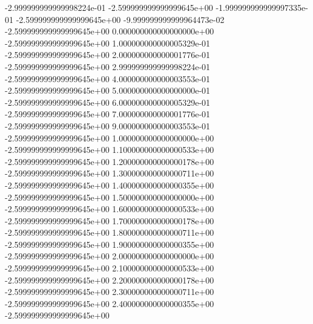 -2.999999999999998224e-01 -2.599999999999999645e+00
-1.999999999999997335e-01 -2.599999999999999645e+00
-9.999999999999964473e-02 -2.599999999999999645e+00
0.000000000000000000e+00 -2.599999999999999645e+00
1.000000000000005329e-01 -2.599999999999999645e+00
2.000000000000001776e-01 -2.599999999999999645e+00
2.999999999999998224e-01 -2.599999999999999645e+00
4.000000000000003553e-01 -2.599999999999999645e+00
5.000000000000000000e-01 -2.599999999999999645e+00
6.000000000000005329e-01 -2.599999999999999645e+00
7.000000000000001776e-01 -2.599999999999999645e+00
9.000000000000003553e-01 -2.599999999999999645e+00
1.000000000000000000e+00 -2.599999999999999645e+00
1.100000000000000533e+00 -2.599999999999999645e+00
1.200000000000000178e+00 -2.599999999999999645e+00
1.300000000000000711e+00 -2.599999999999999645e+00
1.400000000000000355e+00 -2.599999999999999645e+00
1.500000000000000000e+00 -2.599999999999999645e+00
1.600000000000000533e+00 -2.599999999999999645e+00
1.700000000000000178e+00 -2.599999999999999645e+00
1.800000000000000711e+00 -2.599999999999999645e+00
1.900000000000000355e+00 -2.599999999999999645e+00
2.000000000000000000e+00 -2.599999999999999645e+00
2.100000000000000533e+00 -2.599999999999999645e+00
2.200000000000000178e+00 -2.599999999999999645e+00
2.300000000000000711e+00 -2.599999999999999645e+00
2.400000000000000355e+00 -2.599999999999999645e+00
